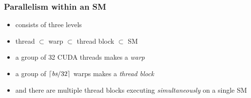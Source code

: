 \documentclass[12pt,dvipdfmx]{beamer}
\newcommand{\ao}[1]{{\color{blue}#1}}
\begin{document}
\begin{frame}
  \frametitle{Parallelism within an SM}
  \begin{itemize}
  \item[] consists of three levels
  \item[]
    \ao{thread $\subset$ warp $\subset$ thread block $\subset$ SM}
  \end{itemize}

  \begin{itemize}
  \item<2-> a group of \ao{32} CUDA threads makes a \ao{\it warp}
  \item<3-> a group of \ao{$\left\lceil \mbox{\it bs} / 32 \right\rceil$}
    warps makes a \ao{\it thread block}
  \item<4-> and there are multiple thread blocks executing {\it simultaneously}
    on a single SM
  \end{itemize}
  \begin{center}

\end{center}
\end{frame}
\end{document}
